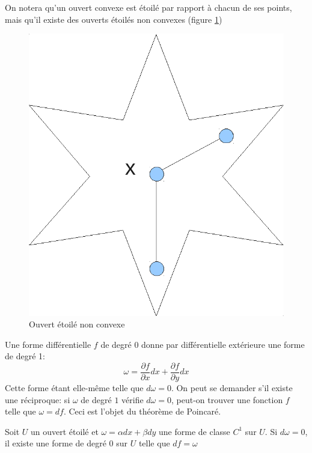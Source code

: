 On notera qu'un ouvert convexe est étoilé par rapport à chacun de ses points,
mais qu'il existe des ouverts étoilés non convexes (figure \ref{ch8:fig6})
\begin{figure}[ht]
\begin{center}
\includegraphics[scale=0.3]{images/ouvert_etoile.pdf}
\end{center}
\caption{Ouvert étoilé non convexe}\label{ch8:fig6}
\end{figure}
Une forme différentielle $f$ de degré $0$ donne par différentielle extérieure
une forme de degré 1:
\[
\omega = \frac{\partial f}{\partial x}dx + \frac{\partial f}{\partial y} dx
\]
Cette forme étant elle-même telle que $d\omega = 0$. On peut se demander s'il
existe une réciproque: si $\omega$ de degré $1$ vérifie $d\omega=0$,
peut-on trouver une fonction $f$ telle que $\omega=df$. Ceci est l'objet du
théorème de Poincaré.

\begin{fthm}
Soit $U$ un ouvert étoilé et $\omega = \alpha dx + \beta dy$ une forme de classe
$C^1$ sur $U$. Si $d\omega = 0$, il existe une forme de degré 0 sur $U$ telle
que $df = \omega$
\end{fthm}

